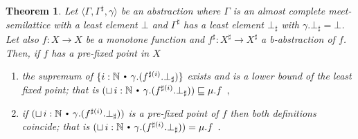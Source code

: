 \documentclass{eptcs}
\theoremstyle{plain}
\newtheorem{theorem}{Theorem}[section]
\theoremstyle{definition}
\newcommand{\Nat}{\ensuremath{\mathbb N}}
\newcommand{\totype}{\ensuremath{\ra}}
\newcommand{\ra}{\ensuremath{\rightarrow}}
\newcommand{\dotsep}{\mbox{\raisebox{0.4ex}{\tiny\ensuremath{\:\;\bullet\;\:}}}}
\newcommand{\slq}{\ensuremath{\sqsubseteq}}
\newcommand{\remark}[2]{}
\newcommand{\remarkD}[1]{\remark{D}{#1}}
\begin{document}
\begin{theorem} \label{thm:abst_fp}
  Let $\langle \Gamma, \Gamma^\sharp, \gamma \rangle$ be an abstraction 
  where $\Gamma$ is an almost complete \mbox{meet-semilattice} with a least
  element $\bot$ and $\Gamma^\sharp$ has a
  least element $\bot_\sharp$ with $\gamma.\bot_\sharp = \bot$.
  Let also $f : X \totype X$ be a monotone function and $f^\sharp : X^\sharp \totype X^\sharp$
  a \mbox{b-abstraction} of $f$. Then, if $f$ has a pre-fixed point in $X$
\begin{enumerate}
  \item \label{it:abst_fp_is_lq}
    \remarkD{Estaria bueno probar $\gamma.(\sqcup \, i:\Nat \dotsep f^{\sharp (i)}.\bot_\sharp )
      \slq  \mu.f$}
    the supremum of $\{i:\Nat \dotsep \gamma.(f^{\sharp
    (i)}.\bot_\sharp)\}$ exists and is a lower bound of the least fixed point;
    that
    is $
    (\sqcup \, i:\Nat \dotsep \gamma.(f^{\sharp (i)}.\bot_\sharp) )
    \slq
    \mu.f \enspace,
    $

  \item \label{it:abst_fp_is_fp}
    \remarkD{Esto es realmente bueno ya que nos daria una forma de
      saber cuando el punto fijo es exacto.}
    \sloppy if 
    $(\sqcup \, i:\Nat \dotsep \gamma.(f^{\sharp(i)}.\bot_\sharp))$ is a
    pre-fixed point of $f$ then both definitions coincide; that
    is \mbox{$
    (\sqcup \, i:\Nat \dotsep \gamma.(f^{\sharp (i)}.\bot_\sharp))
    =
    \mu.f \enspace.
    $}
  \end{enumerate}

\end{theorem}
\end{document}
